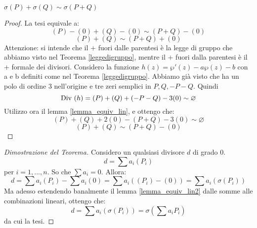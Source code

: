 \begin{lemma}
$\sigma(P)+\sigma(Q) \sim \sigma (P+Q)$
\end{lemma}


\begin{proof}
La tesi equivale a:
$$(P)-(0)+(Q)-(0) \sim (P+Q)-(0)$$
$$(P)+(Q)\sim (P+Q)+(0)$$
Attenzione: si intende che il $+$ fuori dalle parentesi è la legge di gruppo che abbiamo visto nel Teorema \ref{leggedigruppo}, mentre il $+$ fuori dalla parentesi è il $+$ formale dei divisori.
Considero la funzione $h(z) = \wp'(z) - a \wp(z) - b$ con a e b definiti come nel Teorema \ref{leggedigruppo}. Abbiamo già visto che ha un polo di ordine $3$ nell'origine e tre zeri semplici in $P, Q, -P-Q$. Quindi $$\mbox{Div }(h)=(P)+(Q)+(-P-Q)-3(0) \sim \varnothing$$
Utilizzo ora il lemma \ref{lemma_equiv_lin}, e ottengo che:
$$(P)+(Q)+2(0)-(P+Q)-3(0) \sim \varnothing$$
$$(P)+(Q) \sim (P+Q)-(0)$$
\end{proof}

\begin{proof}[Dimostrazione del Teorema]
Considero un qualsiasi divisore $d$ di grado $0$.
$$d=\sum a_i (P_i)$$
per $i=1,...,n$. So che $\sum a_i=0$. Allora:
$$d=\sum a_i (P_i)-\sum a_i (0)=\sum a_i ((P_i)-(0))=\sum a_i (\sigma(P_i))$$
Ma adesso estendendo banalmente il lemma \ref{lemma_equiv_lin2} dalle somme alle combinazioni lineari, ottengo che:
$$d=\sum a_i (\sigma(P_i))=\sigma(\sum a_i P_i)$$
da cui la tesi.
\end{proof}